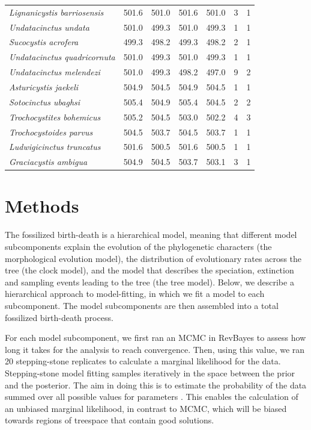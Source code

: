 \documentclass{article}
\begin{document}
\begin{table}[]
\begin{tabular}{l|llIIlI}
\textit{Lignanicystis barriosensis} & 501.6 & 501.0 & 501.6 & 501.0 & 3 & 1\\
\textit{Undatacinctus undata} & 501.0 & 499.3 & 501.0 & 499.3 & 1 & 1\\
\textit{Sucocystis acrofera} & 499.3 & 498.2 & 499.3 & 498.2 & 2 & 1\\
\textit{Undatacinctus quadricornuta} & 501.0 & 499.3 & 501.0 & 499.3 & 1 & 1\\
\textit{Undatacinctus melendezi} & 501.0 & 499.3 & 498.2 & 497.0 & 9 & 2\\
\textit{Asturicystis jaekeli} & 504.9 & 504.5 & 504.9 & 504.5 & 1 & 1\\
\textit{Sotocinctus ubaghsi} & 505.4 & 504.9 & 505.4 & 504.5 & 2 & 2\\
\textit{Trochocystites bohemicus} & 505.2 & 504.5 & 503.0 & 502.2 & 4 & 3\\
\textit{Trochocystoides parvus} & 504.5 & 503.7 & 504.5 & 503.7 & 1 & 1\\
\textit{Ludwigicinctus truncatus} & 501.6 & 500.5 & 501.6 & 500.5 & 1 & 1\\
\textit{Graciacystis ambigua} & 504.9 & 504.5 & 503.7 & 503.1 & 3 & 1 
\end{tabular}
\end{table}


\section{Methods}

The fossilized birth-death is a hierarchical model, meaning that different model subcomponents explain the evolution of the phylogenetic characters (the morphological evolution model), the distribution of evolutionary rates across the tree (the clock model), and the model that describes the speciation, extinction and sampling events leading to the tree (the tree model). 
Below, we describe a hierarchical approach to model-fitting, in which we fit a model to each subcomponent.
The model subcomponents are then assembled into a total fossilized birth-death process.

For each model subcomponent, we first ran an MCMC in RevBayes to assess how long it takes for the analysis to reach convergence. 
Then, using this value, we ran 20 stepping-stone replicates to calculate a marginal likelihood for the data.
Stepping-stone model fitting samples iteratively in the space between the prior and the posterior.
The aim in doing this is to estimate the probability of the data summed over all possible values for parameters  \citep{Xie2011}. 
This enables the calculation of an unbiased marginal likelihood, in contrast to MCMC, which will be biased towards regions of treespace that contain good solutions. 
\end{document}
